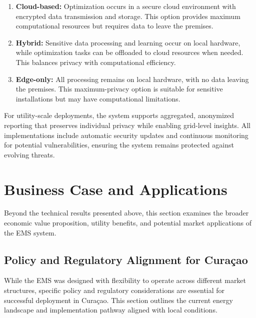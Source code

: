 \documentclass[12pt,a4paper]{article}
\begin{document}
\begin{enumerate}
    \item \textbf{Cloud-based:} Optimization occurs in a secure cloud environment with encrypted data transmission and storage. This option provides maximum computational resources but requires data to leave the premises.
    
    \item \textbf{Hybrid:} Sensitive data processing and learning occur on local hardware, while optimization tasks can be offloaded to cloud resources when needed. This balances privacy with computational efficiency.
    
    \item \textbf{Edge-only:} All processing remains on local hardware, with no data leaving the premises. This maximum-privacy option is suitable for sensitive installations but may have computational limitations.
\end{enumerate}

For utility-scale deployments, the system supports aggregated, anonymized reporting that preserves individual privacy while enabling grid-level insights. All implementations include automatic security updates and continuous monitoring for potential vulnerabilities, ensuring the system remains protected against evolving threats.

\section{Business Case and Applications}\label{sec:business_case}

Beyond the technical results presented above, this section examines the broader economic value proposition, utility benefits, and potential market applications of the EMS system.

\subsection{Policy and Regulatory Alignment for Curaçao}

While the EMS was designed with flexibility to operate across different market structures, specific policy and regulatory considerations are essential for successful deployment in Curaçao. This section outlines the current energy landscape and implementation pathway aligned with local conditions.
\end{document}
